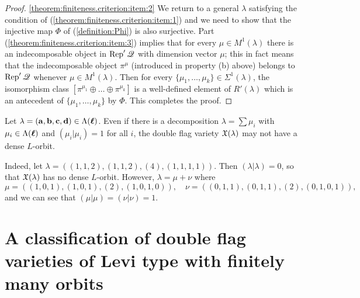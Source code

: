\documentclass[12pt,reqno]{amsart}
\begin{document}
\begin{proof}
\eqref{theorem:finiteness.criterion:item:2}
We return to a general $\lambda$ satisfying the condition of (\ref{theorem:finiteness.criterion:item:1}) and we need to show that the injective map $\Phi$ of (\ref{definition:Phi}) is also surjective.
Part (\ref{theorem:finiteness.criterion:item:3}) implies that for every $\mu\in M^1(\lambda)$ there is an indecomposable object in $\Rep'\quiver$ with dimension vector $\mu$; this in fact means that the indecomposable object $\pi^\mu$ (introduced in property (b) above) belongs to $\Rep'\quiver$ whenever $\mu\in M^1(\lambda)$.
Then for every $\{\mu_1,\ldots,\mu_k\}\in\Sigma^1(\lambda)$,
the isomorphism class $[\pi^{\mu_1}\oplus\ldots\oplus\pi^{\mu_k}]$ is a well-defined element of $R'(\lambda)$ which is an antecedent of $\{\mu_1,\ldots,\mu_k\}$ by $\Phi$. This completes the proof.
\end{proof}


\begin{example}
Let $ \lambda=(\mathbf{a},\mathbf{b},\mathbf{c},\mathbf{d})\in\Lambda(\boldsymbol{\ell}) $.
Even if there is a decomposition $\lambda=\sum \mu_i$ with $\mu_i\in\Lambda(\boldsymbol{\ell})$ and $(\mu_i|\mu_i)=1$ for all $i$,
the double flag variety $ \mathfrak{X}(\lambda) $ may not have a dense $L$-orbit.

Indeed,
let $\lambda=((1,1,2),(1,1,2),(4),(1,1,1,1))$.
Then $(\lambda|\lambda)=0$, so that $\mathfrak{X}(\lambda)$ has no dense $L$-orbit.
However, $\lambda=\mu+\nu$ where
$$
\mu=((1,0,1),(1,0,1),(2),(1,0,1,0)),\quad \nu=((0,1,1),(0,1,1),(2),(0,1,0,1)),
$$
and we can see that $(\mu|\mu)=(\nu|\nu)=1$.
\end{example}


\section{A classification of double flag varieties of Levi type with finitely many orbits}\label{section:classification.proofs}
\end{document}
